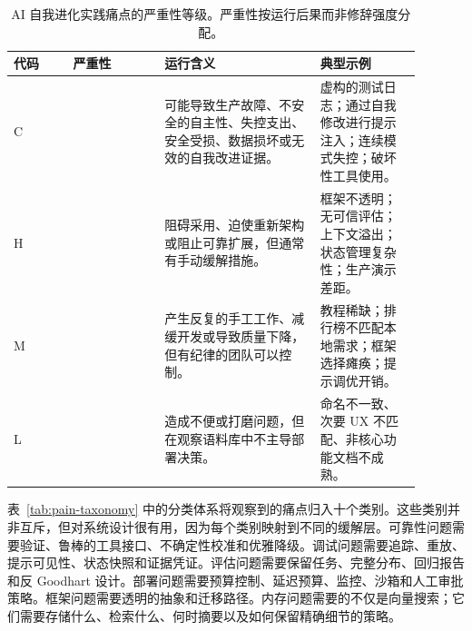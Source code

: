 \begin{table}[t]
\centering
\small
\caption{AI 自我进化实践痛点的严重性等级。严重性按运行后果而非修辞强度分配。}
\label{tab:severity-definitions}
\begin{tabular}{p{0.13\linewidth}p{0.20\linewidth}p{0.34\linewidth}p{0.22\linewidth}}
\hline
\textbf{代码} & \textbf{严重性} & \textbf{运行含义} & \textbf{典型示例} \\
\hline
C & \sevcritical{} & 可能导致生产故障、不安全的自主性、失控支出、安全受损、数据损坏或无效的自我改进证据。 & 虚构的测试日志；通过自我修改进行提示注入；连续模式失控；破坏性工具使用。 \\
H & \sevhigh{} & 阻碍采用、迫使重新架构或阻止可靠扩展，但通常有手动缓解措施。 & 框架不透明；无可信评估；上下文溢出；状态管理复杂性；生产演示差距。 \\
M & \sevmedium{} & 产生反复的手工工作、减缓开发或导致质量下降，但有纪律的团队可以控制。 & 教程稀缺；排行榜不匹配本地需求；框架选择瘫痪；提示调优开销。 \\
L & \sevlow{} & 造成不便或打磨问题，但在观察语料库中不主导部署决策。 & 命名不一致、次要 UX 不匹配、非核心功能文档不成熟。 \\
\hline
\end{tabular}
\end{table}

表~\ref{tab:pain-taxonomy} 中的分类体系将观察到的痛点归入十个类别。这些类别并非互斥，但对系统设计很有用，因为每个类别映射到不同的缓解层。可靠性问题需要验证、鲁棒的工具接口、不确定性校准和优雅降级。调试问题需要追踪、重放、提示可见性、状态快照和证据凭证。评估问题需要保留任务、完整分布、回归报告和反 Goodhart 设计。部署问题需要预算控制、延迟预算、监控、沙箱和人工审批策略。框架问题需要透明的抽象和迁移路径。内存问题需要的不仅是向量搜索；它们需要存储什么、检索什么、何时摘要以及如何保留精确细节的策略。

